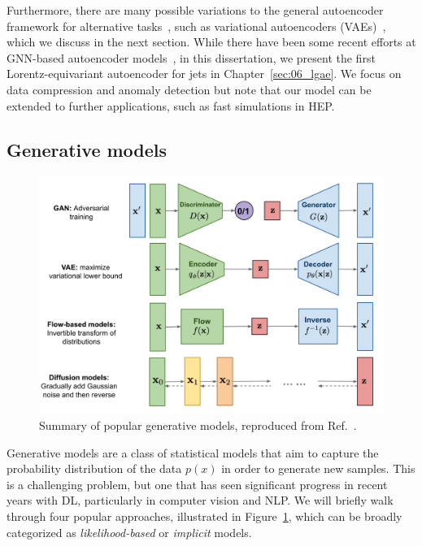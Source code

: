 Furthermore, there are many possible variations to the general autoencoder framework for alternative tasks~\cite{AE-review-1,AE-review-2}, such as variational autoencoders (VAEs)~\cite{VAE}, which we discuss in the next section.
While there have been some recent efforts at GNN-based autoencoder models~\cite{Tsan:2021brw,Atkinson:2021nlt}, in this dissertation, we present the first Lorentz-equivariant autoencoder for jets in Chapter~\ref{sec:06_lgae}.
We focus on data compression and anomaly detection but note that our model can be extended to further applications, such as fast simulations in HEP.

\subsection{Generative models}
\label{sec:03_generative}

\begin{figure}[ht]
    \centering
    \includegraphics[width=\textwidth]{figures/03-ML/generative-overview.png}
    \caption{Summary of popular generative models, reproduced from Ref.~\cite{weng2021diffusion}.}
    \label{fig:03_ml_generative}
\end{figure}

Generative models are a class of statistical models that aim to capture the probability distribution of the data $p(x)$ in order to generate new samples.
This is a challenging problem, but one that has seen significant progress in recent years with DL, particularly in computer vision and NLP.
We will briefly walk through four popular approaches, illustrated in Figure~\ref{fig:03_ml_generative}, which can be broadly categorized as \textit{likelihood-based} or \textit{implicit} models.

